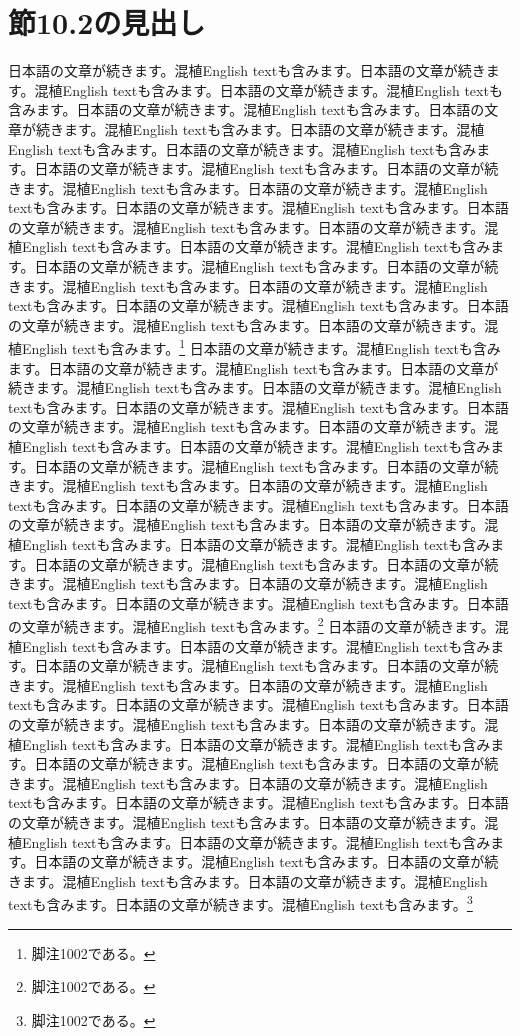 \documentclass[pdflatex,book]{jlreq}
\begin{document}
\section{節10.2の見出し}
日本語の文章が続きます。混植English textも含みます。日本語の文章が続きます。混植English textも含みます。日本語の文章が続きます。混植English textも含みます。日本語の文章が続きます。混植English textも含みます。日本語の文章が続きます。混植English textも含みます。日本語の文章が続きます。混植English textも含みます。日本語の文章が続きます。混植English textも含みます。日本語の文章が続きます。混植English textも含みます。日本語の文章が続きます。混植English textも含みます。日本語の文章が続きます。混植English textも含みます。日本語の文章が続きます。混植English textも含みます。日本語の文章が続きます。混植English textも含みます。日本語の文章が続きます。混植English textも含みます。日本語の文章が続きます。混植English textも含みます。日本語の文章が続きます。混植English textも含みます。日本語の文章が続きます。混植English textも含みます。日本語の文章が続きます。混植English textも含みます。日本語の文章が続きます。混植English textも含みます。日本語の文章が続きます。混植English textも含みます。日本語の文章が続きます。混植English textも含みます。\footnote{脚注1002である。}
日本語の文章が続きます。混植English textも含みます。日本語の文章が続きます。混植English textも含みます。日本語の文章が続きます。混植English textも含みます。日本語の文章が続きます。混植English textも含みます。日本語の文章が続きます。混植English textも含みます。日本語の文章が続きます。混植English textも含みます。日本語の文章が続きます。混植English textも含みます。日本語の文章が続きます。混植English textも含みます。日本語の文章が続きます。混植English textも含みます。日本語の文章が続きます。混植English textも含みます。日本語の文章が続きます。混植English textも含みます。日本語の文章が続きます。混植English textも含みます。日本語の文章が続きます。混植English textも含みます。日本語の文章が続きます。混植English textも含みます。日本語の文章が続きます。混植English textも含みます。日本語の文章が続きます。混植English textも含みます。日本語の文章が続きます。混植English textも含みます。日本語の文章が続きます。混植English textも含みます。日本語の文章が続きます。混植English textも含みます。日本語の文章が続きます。混植English textも含みます。\footnote{脚注1002である。}
日本語の文章が続きます。混植English textも含みます。日本語の文章が続きます。混植English textも含みます。日本語の文章が続きます。混植English textも含みます。日本語の文章が続きます。混植English textも含みます。日本語の文章が続きます。混植English textも含みます。日本語の文章が続きます。混植English textも含みます。日本語の文章が続きます。混植English textも含みます。日本語の文章が続きます。混植English textも含みます。日本語の文章が続きます。混植English textも含みます。日本語の文章が続きます。混植English textも含みます。日本語の文章が続きます。混植English textも含みます。日本語の文章が続きます。混植English textも含みます。日本語の文章が続きます。混植English textも含みます。日本語の文章が続きます。混植English textも含みます。日本語の文章が続きます。混植English textも含みます。日本語の文章が続きます。混植English textも含みます。日本語の文章が続きます。混植English textも含みます。日本語の文章が続きます。混植English textも含みます。日本語の文章が続きます。混植English textも含みます。日本語の文章が続きます。混植English textも含みます。\footnote{脚注1002である。}
\end{document}
